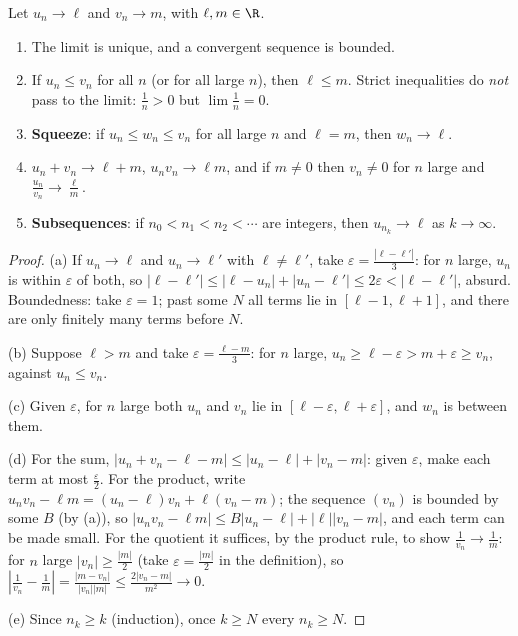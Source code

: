 \begin{propositionx}
Let $u_n\to\ell$ and $v_n\to m$, with $\ell,m\in\R$.
\begin{enumerate}[label=(\alph*)]
\item The limit is unique, and a convergent sequence is bounded.
\item If $u_n\le v_n$ for all $n$ (or for all large $n$), then $\ell\le m$. Strict inequalities do \emph{not} pass to the limit: $\frac1n>0$ but $\lim\frac1n=0$.
\item \textbf{Squeeze}: if $u_n\le w_n\le v_n$ for all large $n$ and $\ell=m$, then $w_n\to\ell$.
\item $u_n+v_n\to\ell+m$, $u_nv_n\to\ell m$, and if $m\ne0$ then $v_n\ne0$ for $n$ large and $\frac{u_n}{v_n}\to\frac\ell m$.
\item \textbf{Subsequences}: if $n_0<n_1<n_2<\cdots$ are integers, then $u_{n_k}\to\ell$ as $k\to\infty$.
\end{enumerate}
\end{propositionx}
\begin{proof}
(a) If $u_n\to\ell$ and $u_n\to\ell'$ with $\ell\ne\ell'$, take $\varepsilon=\frac{|\ell-\ell'|}3$: for $n$ large, $u_n$ is within $\varepsilon$ of both,
so $|\ell-\ell'|\le|\ell-u_n|+|u_n-\ell'|\le2\varepsilon<|\ell-\ell'|$, absurd. Boundedness: take $\varepsilon=1$; past some $N$ all terms lie in
$[\ell-1,\ell+1]$, and there are only finitely many terms before $N$.

(b) Suppose $\ell>m$ and take $\varepsilon=\frac{\ell-m}3$: for $n$ large, $u_n\ge\ell-\varepsilon>m+\varepsilon\ge v_n$, against $u_n\le v_n$.

(c) Given $\varepsilon$, for $n$ large both $u_n$ and $v_n$ lie in $[\ell-\varepsilon,\ell+\varepsilon]$, and $w_n$ is between them.

(d) For the sum, $|u_n+v_n-\ell-m|\le|u_n-\ell|+|v_n-m|$: given $\varepsilon$, make each term at most $\frac\varepsilon2$. For the product, write
$u_nv_n-\ell m=(u_n-\ell)v_n+\ell(v_n-m)$; the sequence $(v_n)$ is bounded by some $B$ (by (a)), so $|u_nv_n-\ell m|\le B|u_n-\ell|+|\ell||v_n-m|$,
and each term can be made small. For the quotient it suffices, by the product rule, to show $\frac1{v_n}\to\frac1m$: for $n$ large $|v_n|\ge\frac{|m|}2$
(take $\varepsilon=\frac{|m|}2$ in the definition), so $\left|\frac1{v_n}-\frac1m\right|=\frac{|m-v_n|}{|v_n||m|}\le\frac{2|v_n-m|}{m^2}\to0$.

(e) Since $n_k\ge k$ (induction), once $k\ge N$ every $n_k\ge N$.
\end{proof}

